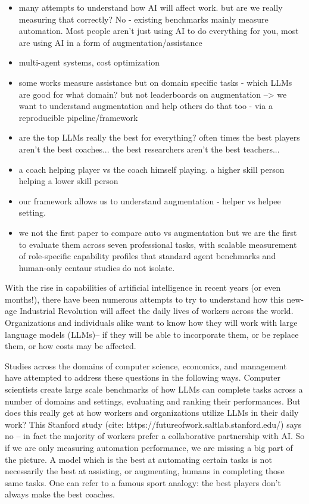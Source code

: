\begin{itemize}
        \item many attempts to understand how AI will affect work. but are we really measuring that correctly? No - existing benchmarks mainly measure automation. Most people aren't just using AI to do everything for you, most are using AI in a form of augmentation/assistance
        \item multi-agent systems, cost optimization
        \item some works measure assistance but on domain specific tasks - which LLMs are good for what domain? but not leaderboards on augmentation --> we want to understand augmentation and help others do that too - via a reproducible pipeline/framework
        \item are the top LLMs really the best for everything? often times the best players aren't the best coaches... the best researchers aren't the best teachers...
        \item a coach helping player vs the coach himself playing. a higher skill person helping a lower skill person
        \item our framework allows us to understand augmentation - helper vs helpee setting. 
        \item we not the first paper to compare auto vs augmentation but we are the first to evaluate them across seven professional tasks, with scalable measurement of role-specific capability profiles that standard agent benchmarks and human-only centaur studies do not isolate.
    \end{itemize}



With the rise in capabilities of artificial intelligence in recent years (or even months!), there have been numerous attempts to try to understand how this new-age Industrial Revolution will affect the daily lives of workers across the world. Organizations and individuals alike want to know how they will work with large language models (LLMs)-- if they will be able to incorporate them, or be replace them, or how costs may be affected. 

Studies across the domains of computer science, economics, and management have attempted to address these questions in the following ways. Computer scientists create large scale benchmarks of how LLMs can complete tasks across a number of domains and settings, evaluating and ranking their performances. But does this really get at how workers and organizations utilize LLMs in their daily work? This Stanford study (cite: https://futureofwork.saltlab.stanford.edu/) says no -- in fact the majority of workers prefer a collaborative partnership with AI. So if we are only measuring automation performance, we are missing a big part of the picture. A model which is the best at automating certain tasks is not necessarily the best at assisting, or augmenting, humans in completing those same tasks. One can refer to a famous sport analogy: the best players don't always make the best coaches.
    
